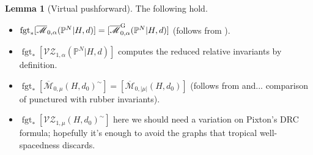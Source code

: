 \documentclass[11pt]{amsart}
\newcommand{\M}[4]{\overline{\mathcal{M}}_{#1,#2}(#3,#4)}
\newcommand{\MG}[4]{\overline{\mathcal{M}}^{\rm G}_{#1,#2}(#3,#4)}
\newcommand{\PP}{\mathbb P}
\newcommand{\VZc}[4]{\mathcal{V\!Z}_{#1,#2}(#3,#4)}
\newcommand{\fgt}{\operatorname{fgt}}
\theoremstyle{definition}
\newtheorem{lemma}[thm]{Lemma}
\theoremstyle{definition}
\begin{document}
\begin{lemma}[Virtual pushforward] The following hold.
 \begin{itemize}
  \item $\fgt_*[\M{0}{\alpha}{\PP^N|H}{d}]=[\MG{0}{\alpha}{\PP^N|H}{d}]$ (follows from \cite{GathmannThesis,AbramovichMarcusWiseComparison}).
  \item $\fgt_*[\VZc{1}{\alpha}{\PP^N|H}{d}]$ computes the reduced relative invariants by definition.
  \item $\fgt_*[\M{0}{\mu}{H}{d_0}^\sim]=[\M{0}{\lvert\mu\rvert}{H}{d_0}]$ (follows from \cite{GathmannThesis} and... comparison of punctured with rubber invariants).
  \item $\fgt_*[\VZc{1}{\mu}{H}{d_0}^\sim]$ here we should need a variation on Pixton's DRC formula; hopefully it's enough to avoid the graphs that tropical well-spacedness discards.
 \end{itemize}
\end{lemma}
\end{document}
